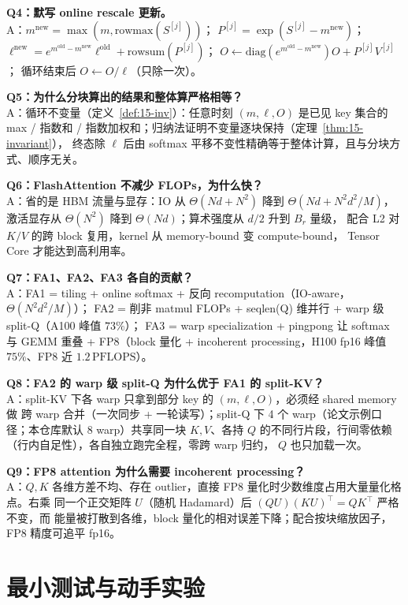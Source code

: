 \textbf{Q4：默写 online rescale 更新。}\\
A：$m^{\mathrm{new}} = \max(m, \mathrm{rowmax}(S^{[j]}))$；
$P^{[j]} = \exp(S^{[j]} - m^{\mathrm{new}})$；
$\ell^{\mathrm{new}} = e^{m^{\mathrm{old}}-m^{\mathrm{new}}}\ell^{\mathrm{old}} +
\mathrm{rowsum}(P^{[j]})$；
$O \leftarrow \mathrm{diag}(e^{m^{\mathrm{old}}-m^{\mathrm{new}}})O + P^{[j]}V^{[j]}$；
循环结束后 $O \leftarrow O/\ell$（只除一次）。

\textbf{Q5：为什么分块算出的结果和整体算严格相等？}\\
A：循环不变量（定义~\ref{def:15-inv}）：任意时刻 $(m, \ell, O)$ 是已见 key 集合的
max / 指数和 / 指数加权和；归纳法证明不变量逐块保持（定理~\ref{thm:15-invariant}），
终态除 $\ell$ 后由 softmax 平移不变性精确等于整体计算，且与分块方式、顺序无关。

\textbf{Q6：FlashAttention 不减少 FLOPs，为什么快？}\\
A：省的是 HBM 流量与显存：IO 从 $\Theta(Nd + N^{2})$ 降到 $\Theta(Nd + N^{2}d^{2}/M)$，
激活显存从 $\Theta(N^{2})$ 降到 $\Theta(Nd)$；算术强度从 $d/2$ 升到 $B_r$ 量级，
配合 L2 对 $K/V$ 的跨 block 复用，kernel 从 memory-bound 变 compute-bound，
Tensor Core 才能达到高利用率。

\textbf{Q7：FA1、FA2、FA3 各自的贡献？}\\
A：FA1 = tiling + online softmax + 反向 recomputation（IO-aware，$\Theta(N^{2}d^{2}/M)$）；
FA2 = 削非 matmul FLOPs + seqlen(Q) 维并行 + warp 级 split-Q（A100 峰值 $73\%$）；
FA3 = warp specialization + pingpong 让 softmax 与 GEMM 重叠 + FP8（block 量化 +
incoherent processing，H100 fp16 峰值 $75\%$、FP8 近 $1.2\,\mathrm{PFLOPS}$）。

\textbf{Q8：FA2 的 warp 级 split-Q 为什么优于 FA1 的 split-KV？}\\
A：split-KV 下各 warp 只拿到部分 key 的 $(m, \ell, O)$，必须经 shared memory 做
跨 warp 合并（一次同步 + 一轮读写）；split-Q 下 4 个 warp（论文示例口径；本仓库默认
8 warp）共享同一块 $K, V$、各持
$Q$ 的不同行片段，行间零依赖（行内自足性），各自独立跑完全程，零跨 warp 归约，
$Q$ 也只加载一次。

\textbf{Q9：FP8 attention 为什么需要 incoherent processing？}\\
A：$Q, K$ 各维方差不均、存在 outlier，直接 FP8 量化时少数维度占用大量量化格点。右乘
同一个正交矩阵 $U$（随机 Hadamard）后 $(QU)(KU)^{\top} = QK^{\top}$ 严格不变，而
能量被打散到各维，block 量化的相对误差下降；配合按块缩放因子，FP8 精度可追平
fp16。

\section{最小测试与动手实验}

